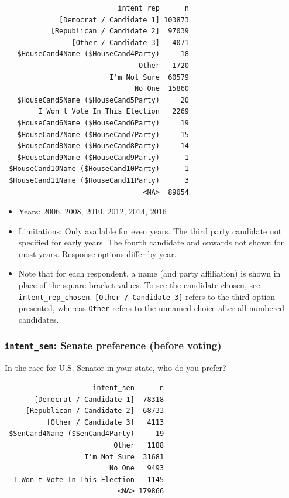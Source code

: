 \documentclass[10pt,article,oneside]{memoir}
\theoremstyle{definition}
\begin{document}
\begin{verbatim}
                           intent_rep      n
             [Democrat / Candidate 1] 103873
           [Republican / Candidate 2]  97039
                [Other / Candidate 3]   4071
   $HouseCand4Name ($HouseCand4Party)     18
                                Other   1720
                         I'm Not Sure  60579
                               No One  15860
   $HouseCand5Name ($HouseCand5Party)     20
        I Won't Vote In This Election   2269
   $HouseCand6Name ($HouseCand6Party)     19
   $HouseCand7Name ($HouseCand7Party)     15
   $HouseCand8Name ($HouseCand8Party)     14
   $HouseCand9Name ($HouseCand9Party)      1
 $HouseCand10Name ($HouseCand10Party)      1
 $HouseCand11Name ($HouseCand11Party)      3
                                 <NA>  89054
\end{verbatim}

\begin{itemize}
\tightlist
\item
  Years: 2006, 2008, 2010, 2012, 2014, 2016
\item
  Limitations: Only available for even years. The third party candidate
  not specified for early years. The fourth candidate and onwards not
  shown for most years. Response options differ by year.
\item
  Note that for each respondent, a name (and party affiliation) is shown
  in place of the square bracket values. To see the candidate chosen,
  see \texttt{intent\_rep\_chosen}.
  \texttt{{[}Other\ /\ Candidate\ 3{]}} refers to the third option
  presented, whereas \texttt{Other} refers to the unnamed choice after
  all numbered candidates.
\end{itemize}

\subsubsection{\texorpdfstring{\texttt{intent\_sen}: Senate preference
(before
voting)}{intent\_sen: Senate preference (before voting)}}\label{intent_sen-senate-preference-before-voting}

In the race for U.S. Senator in your state, who do you prefer?

\begin{verbatim}
                     intent_sen      n
       [Democrat / Candidate 1]  78318
     [Republican / Candidate 2]  68733
          [Other / Candidate 3]   4113
 $SenCand4Name ($SenCand4Party)     19
                          Other   1188
                   I'm Not Sure  31681
                         No One   9493
  I Won't Vote In This Election   1145
                           <NA> 179866
\end{verbatim}
\end{document}
